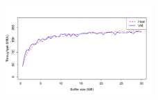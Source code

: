 \begin{figure}[ht!]
	\includegraphics[width=0.5\textwidth]{./figures/p1.pdf}
	\caption{}
	\label{fig:p1graph}
\end{figure}


